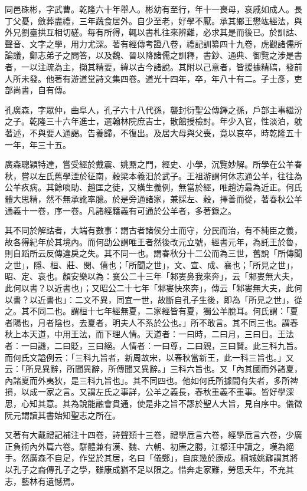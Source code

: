 \begin{pinyinscope}
同邑硃彬，字武曹。乾隆六十年舉人。彬幼有至行，年十一喪母，哀戚如成人。長丁父憂，斂葬盡禮，三年蔬食居外。自少至老，好學不厭。承其鄉王懋竑經法，與外兄劉臺拱互相切磋。每有所得，輒以書札往來辨難，必求其是而後已。於訓詁、聲音、文字之學，用力尤深。著有經傳考證八卷，禮記訓纂四十九卷，虎觀諸儒所論議，鄭志弟子之問答，以及魏、晉以降諸儒之訓釋，書鈔、通典、御覽之涉是書者，一以注疏為主，擷其精要，緯以古今諸說。其附以己意者，皆援據精碻，發前人所未發。他著有游道堂詩文集四卷。道光十四年，卒，年八十有二。子士彥，吏部尚書，自有傳。

孔廣森，字眾仲，曲阜人，孔子六十八代孫，襲封衍聖公傳鐸之孫，戶部主事繼汾之子。乾隆三十六年進士，選翰林院庶吉士，散館授檢討。年少入官，性淡泊，躭著述，不與要人通謁。告養歸，不復出。及居大母與父喪，竟以哀卒，時乾隆五十一年，年三十五。

廣森聰穎特達，嘗受經於戴震、姚鼐之門，經史、小學，沉覽妙解。所學在公羊春秋，嘗以左氏舊學湮於征南，穀梁本義汨於武子。王祖游謂何休志通公羊，往往為公羊疚病。其餘啖助、趙匡之徒，又橫生義例，無當於經，唯趙汸最為近正。何氏體大思精，然不無承訛率臆。於是旁通諸家，兼採左、穀，擇善而從，著春秋公羊通義十一卷，序一卷。凡諸經籍義有可通於公羊者，多著錄之。

其不同於解詁者，大端有數事：謂古者諸侯分土而守，分民而治，有不純臣之義，故各得紀年於其境內。而何劭公謂唯王者然後改元立號，經書元年，為託王於魯，則自蹈所云反傳違戾之失。其不同一也。謂春秋分十二公而為三世，舊說「所傳聞之世」，隱、桓、莊、閔、僖也；「所聞之世」，文、宣、成、襄也；「所見之世」，昭、定、哀也。顏安樂以為：襄公二十三年「邾婁鼻我來奔」，云「邾婁無大夫，此何以書？以近書也」；又昭公二十七年「邾婁快來奔」，傳云「邾婁無大夫，此何以書？以近書也」：二文不異，同宜一世，故斷自孔子生後，即為「所見之世」，從之。其不同二也。謂桓十七年經無夏，二家經皆有夏，獨公羊脫耳。何氏謂：「夏者陽也，月者陰也，去夏者，明夫人不系於公也。」所不敢言。其不同三也。謂春秋上本天道，中用王法，而下理人情。天道者：一曰時，二曰月，三曰日。王法者：一曰譏，二曰貶，三曰絕。人情者：一曰尊，二曰親，三曰賢。此三科九旨。而何氏文謚例云：「三科九旨者，新周故宋，以春秋當新王，此一科三旨也。」又云：「所見異辭，所聞異辭，所傳聞又異辭。」三科六旨也。又「內其國而外諸夏，內諸夏而外夷狄，是三科九旨也」。其不同四也。他如何氏所據間有失者，多所裨損，以成一家之言。又謂左氏之事詳，公羊之義長，春秋重義不重事。皆好學深思，心知其意。其為說能融會貫通，使是非之旨不謬於聖人大旨，見自序中。儀徵阮元謂讀其書始知聖志之所在。

又著有大戴禮記補注十四卷，詩聲類十三卷，禮學卮言六卷，經學卮言六卷，少廣正負術內外篇六卷。駢體兼有漢、魏、六朝、初唐之勝，江都汪中讀之，嘆為絕手。然廣森不自足，作堂於其居，名曰「儀鄭」，自庶幾於康成。桐城姚鼐謂其將以孔子之裔傳孔子之學，雖康成猶不足以限之。惜奔走家難，勞思夭年，不充其志，藝林有遺憾焉。


\end{pinyinscope}
